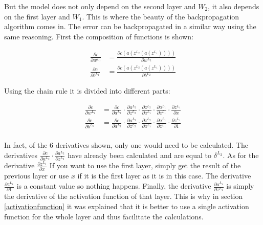 But the model does not only depend on the second layer and $W_2$, it also depends on the first layer and $W_1$. This is where the beauty of the backpropagation algorithm comes in. The error can be backpropagated in a similar way using the same reasoning. First the composition of functions is shown:

\begin{equation}
\begin{split}
    \frac{\partial c}{\partial w^{L_1}} &= \frac{\partial c(a(z^{L_2}(a(z^{L_1}))))}{\partial w^{L_2}} \\
    \frac{\partial c}{\partial b^{L_1}} &= \frac{\partial c(a(z^{L_2}(a(z^{L_1}))))}{\partial b^{L_2}} 
    \label{eqn:backpropagationsimplenetworklayer2}
\end{split}
\end{equation}

Using the chain rule it is divided into different parts:

\begin{equation}
\begin{split}
     \frac{\partial c}{\partial w^{L_1}} &= \frac{\partial c}{\partial a^{L_2}} \cdot \frac{\partial a^{L_2}}{\partial z^{L_2}} \cdot \frac{\partial z^{L_2}}{\partial a^{L_1}} \cdot \frac{\partial a^{L_1}}{\partial z^{L_1}} \cdot \frac{\partial z^{L_1}}{\partial x} \\
     \frac{\partial c}{\partial b^{L_1}} &= \frac{\partial c}{\partial a^{L_2}} \cdot \frac{\partial a^{L_2}}{\partial z^{L_2}} \cdot \frac{\partial z^{L_2}}{\partial a^{L_1}} \cdot \frac{\partial a^{L_1}}{\partial z^{L_1}} \cdot \frac{\partial z^{L_1}}{\partial 1} \\
\end{split}
 \label{eqn:backpropagationlayer1}
\end{equation}

In fact, of the $6$ derivatives shown, only one would need to be calculated. The derivatives $\frac{\partial c}{\partial a^{L_2}} \cdot \frac{\partial a^{L_2}}{\partial z^{L_2}} $ have already been calculated and are equal to $\delta^{L_2}$. As for the derivative $\frac{\partial z^{L_1}}{\partial x}$ If you want to use the first layer, simply get the result of the previous layer or use $x$ if it is the first layer as it is in this case. The derivative $\frac{\partial z^{L_1}}{\partial 1}$ is a constant value so nothing happens. Finally, the derivative $\frac{\partial a^{L_1}}{\partial z^{L_1}}$ is simply the derivative of the activation function of that layer. This is why in section \ref{activationfunction} it was explained that it is better to use a single activation function for the whole layer and thus facilitate the calculations.
\newline

